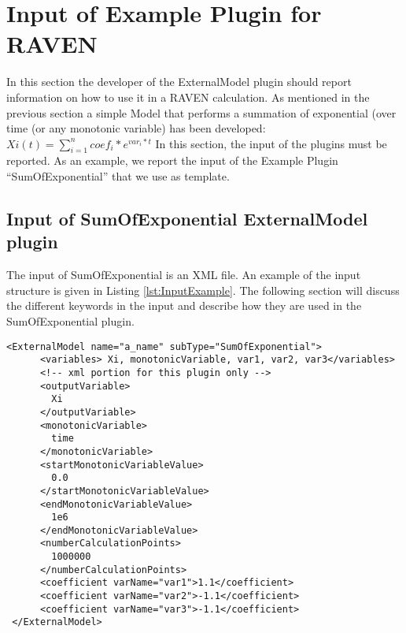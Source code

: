 \section{Input of Example Plugin for RAVEN}
In this section the developer of the ExternalModel plugin should report information
on how to use it in a RAVEN calculation. As mentioned in the previous section a simple 
Model that performs a summation of exponential (over time (or any monotonic variable) has been developed:
\newline
 \begin{math}
        Xi(t)=\sum_{i=1}^{n} coef_i*e^{var_i*t}
  \end{math}
  \newline
In this section, the input of the plugins must be reported. As an example, we report the
input of the Example Plugin ``SumOfExponential'' that we use as template.

\subsection{Input of SumOfExponential ExternalModel plugin}

The input of SumOfExponential is an XML file. An example of the input structure is given in Listing \ref{lst:InputExample}. The following section will discuss the
 different keywords in the input and describe how they are used in the SumOfExponential plugin.

\begin{lstlisting}[style=XML,morekeywords={anAttribute},caption=SumOfExponential 
  input example., label=lst:InputExample]
  <ExternalModel name="a_name" subType="SumOfExponential">
      <variables> Xi, monotonicVariable, var1, var2, var3</variables>
      <!-- xml portion for this plugin only -->
      <outputVariable>
        Xi
      </outputVariable>
      <monotonicVariable>
        time
      </monotonicVariable>
      <startMonotonicVariableValue>
        0.0
      </startMonotonicVariableValue>
      <endMonotonicVariableValue>
        1e6
      </endMonotonicVariableValue>
      <numberCalculationPoints>
        1000000
      </numberCalculationPoints>
      <coefficient varName="var1">1.1</coefficient>
      <coefficient varName="var2">-1.1</coefficient>
      <coefficient varName="var3">-1.1</coefficient>
 </ExternalModel>
\end{lstlisting}

